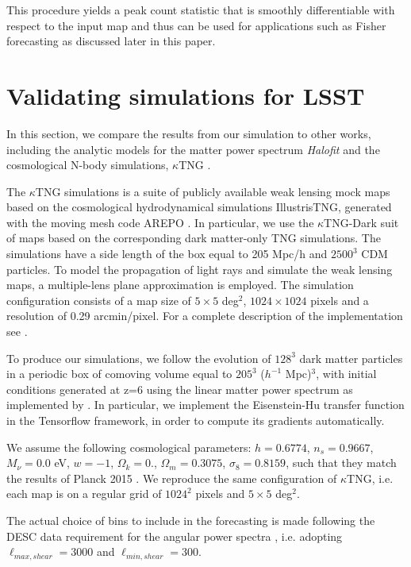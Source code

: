 \documentclass[twocolumn,twocolappendix]{aastex63}
\begin{document}
This procedure yields a peak count statistic that is smoothly differentiable with respect to the input map and thus can be used for applications such as Fisher forecasting as discussed later in this paper.

\section{Validating simulations for LSST}\label{Validating_simulations_for_LSST_Y}
In this section, we compare the results from our simulation to other works, including the analytic models for the matter power spectrum \textit{Halofit} \citep{smith2003stable,takahashi2012revising} and the cosmological N-body simulations, $\kappa$TNG \citep{osato2021kappatng}.


The $\kappa$TNG simulations is a suite of publicly available weak lensing mock maps based on the cosmological hydrodynamical simulations IllustrisTNG, generated with the moving mesh code AREPO \citep{2010MNRAS.401..791S}.
In particular, we use the $\kappa$TNG-Dark suit of maps based on the corresponding dark matter-only TNG simulations. 
The simulations have a side length of the box equal to 205 Mpc/h and $2500^3$ CDM particles.
To model the propagation of light rays and simulate the weak lensing maps, a multiple-lens plane approximation is employed. 
The simulation configuration consists of a map size of $5\times5$ deg$^2$, $1024\times 1024$ pixels and a resolution of 0.29 arcmin/pixel. 
For a complete description of the implementation see \cite{osato2021kappatng}.


To produce our simulations, we follow the evolution of $128^3$ dark matter particles in a periodic box of comoving volume equal to $205^3$ ($h^{-1}$ Mpc)$^3$, with initial conditions generated at z=6 using the linear matter power spectrum as implemented by \cite{eisenstein1998baryonic}. In particular, we implement the  Eisenstein-Hu transfer function in the Tensorflow framework, in order to compute its gradients automatically.

We assume the following cosmological parameters: $h=0.6774$, $n_s =0.9667$, $M_{\nu} = 0.0$ eV, $w=-1$, $\Omega_k = 0.$, $\Omega_m=0.3075$, $\sigma_8= 0.8159$, such that they match the results of Planck 2015 \citep{ade2016planck}.
We reproduce the same configuration of $\kappa$TNG, i.e. each map is on a regular grid of $1024^2$ pixels and $5\times 5$ deg$^2$.


The actual choice of bins to include in the forecasting is made following the DESC data requirement for the angular power spectra \citep{mandelbaum2018lsst}, i.e. adopting $\ell_{max,shear} = 3000$ and  $\ell_{min,shear} = 300$. 
\end{document}

